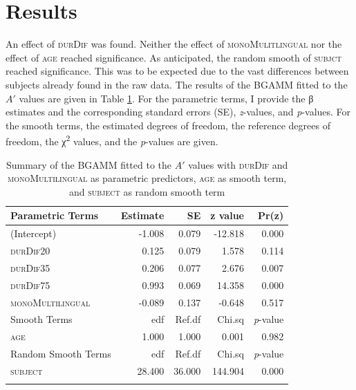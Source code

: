 \section{Results}\label{section06_3}

An effect of \textsc{durDif} was found. Neither the effect of \textsc{monoMulitlingual} nor the effect of \textsc{age} reached significance. As anticipated, the random smooth of \textsc{subjct} reached significance. This was to be expected due to the vast differences between subjects already found in the raw data. The results of the BGAMM fitted to the $A'$ values are given in Table \ref{tab:6.11}. For the parametric terms, I provide the β estimates and the corresponding standard errors (SE), \textit{z}-values, and \textit{p}-values. For the smooth terms, the estimated degrees of freedom, the reference degrees of freedom, the χ\textsuperscript{2} values, and the \textit{p}-values are given.

\begin{table}\fontsize{10}{11}
\caption{Summary of the BGAMM fitted to the $A'$ values with \textsc{durDif} and \textsc{monoMultilingual} as parametric predictors, \textsc{age} as smooth term, and \textsc{subject} as random smooth term}
\label{tab:6.11}
\centering
\begin{tabular}{lrrrr} 
\lsptoprule
Parametric Terms    & Estimate & SE     & z value & Pr(\textbar{}z\textbar{})  \\ 
\midrule
(Intercept)         & -1.008   & 0.079  & -12.818 & 0.000                      \\
\textsc{durDif20}            & 0.125    & 0.079  & 1.578   & 0.114                      \\
\textsc{durDif35}            & 0.206    & 0.077  & 2.676   & 0.007                      \\
\textsc{durDif75}            & 0.993    & 0.069  & 14.358  & 0.000                      \\
\textsc{monoMultilingual}    & -0.089   & 0.137  & -0.648  & 0.517                      \\ 
\midrule
Smooth Terms        & edf      & Ref.df & Chi.sq  & \textit{p}-value           \\ 
\midrule
\textsc{age}                 & 1.000    & 1.000  & 0.001   & 0.982                      \\ 
\midrule
Random Smooth Terms & edf      & Ref.df & Chi.sq  & \textit{p}-value           \\ 
\midrule
\textsc{subject}             & 28.400   & 36.000 & 144.904 & 0.000                      \\
\lspbottomrule
\end{tabular}
\end{table}

